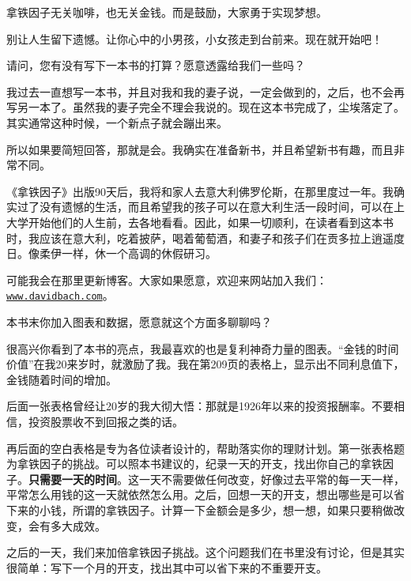 拿铁因子无关咖啡，也无关金钱。而是鼓励，大家勇于实现梦想。

别让人生留下遗憾。让你心中的小男孩，小女孩走到台前来。现在就开始吧！


\vspace{2em}

{\heiti 请问，您有没有写下一本书的打算？愿意透露给我们一些吗？}

\vspace{1em}

我过去一直想写一本书，并且对我和我的妻子说，一定会做到的，之后，也不会再写另一本了。虽然我的妻子完全不理会我说的。现在这本书完成了，尘埃落定了。其实通常这种时候，一个新点子就会蹦出来。

所以如果要简短回答，那就是会。我确实在准备新书，并且希望新书有趣，而且非常不同。

《拿铁因子》出版90天后，我将和家人去意大利佛罗伦斯，在那里度过一年。我确实过了没有遗憾的生活，而且希望我的孩子可以在意大利生活一段时间，可以在上大学开始他们的人生前，去各地看看。因此，如果一切顺利，在读者看到这本书时，我应该在意大利，吃着披萨，喝着葡萄酒，和妻子和孩子们在贡多拉上逍遥度日。像柔伊一样，休一个高调的休假研习。

可能我会在那里更新博客。大家如果愿意，欢迎来网站加入我们：\href{https://davidbach.com/}{\nolinkurl{www.davidbach.com}}。

\vspace{2em}

{\heiti 本书末你加入图表和数据，愿意就这个方面多聊聊吗？}\vspace{1em}

很高兴你看到了本书的亮点，我最喜欢的也是复利神奇力量的图表。“金钱的时间价值”在我20来岁时，就激励了我。我在第209页的表格上，显示出不同利息值下，金钱随着时间的增加。

后面一张表格曾经让20岁的我大彻大悟：那就是1926年以来的投资报酬率。不要相信，投资股票收不到回报之类的话。

再后面的空白表格是专为各位读者设计的，帮助落实你的理财计划。第一张表格题为拿铁因子的挑战。可以照本书建议的，纪录一天的开支，找出你自己的拿铁因子。\textbf{只需要一天的时间}。这一天不需要做任何改变，好像过去平常的每一天一样，平常怎么用钱的这一天就依然怎么用。之后，回想一天的开支，想出哪些是可以省下来的小钱，所谓的拿铁因子。计算一下金额会是多少，想一想，如果只要稍做改变，会有多大成效。

之后的一天，我们来加倍拿铁因子挑战。这个问题我们在书里没有讨论，但是其实很简单：写下一个月的开支，找出其中可以省下来的不重要开支。


\vspace{2em}

